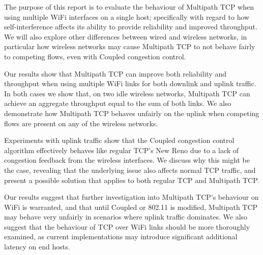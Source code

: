 \documentclass[12pt,a4paper]{article}
\begin{document}
The purpose of this report is to evaluate the behaviour of Multipath TCP when
using multiple WiFi interfaces on a single host; specifically with regard to
how self-interference affects its ability to provide reliability and improved
throughput. We will also explore other differences between wired and wireless
networks, in particular how wireless networks may cause Multipath TCP to not
behave fairly to competing flows, even with Coupled congestion control.

Our results show that Multipath TCP can improve both reliability and throughput
when using multiple WiFi links for both downlink and uplink traffic. In both
cases we show that, on two idle wireless networks, Multipath TCP can achieve an
aggregate throughput equal to the sum of both links. We also demonstrate how
Multipath TCP behaves unfairly on the uplink when competing flows are present on
any of the wireless networks.

Experiments with uplink traffic show that the Coupled congestion control
algorithm effectively behaves like regular TCP's New Reno due to a lack of
congestion feedback from the wireless interfaces. We discuss why this might be
the case, revealing that the underlying issue also affects normal TCP traffic,
and present a possible solution that applies to both regular TCP and Multipath
TCP.

Our results suggest that further investigation into Multipath TCP's behaviour on
WiFi is warranted, and that until Coupled or 802.11 is modified, Multipath TCP
may behave very unfairly in scenarios where uplink traffic dominates. We also
suggest that the behaviour of TCP over WiFi links should be more thoroughly
examined, as current implementations may introduce significant additional
latency on end hosts.
\end{document}
